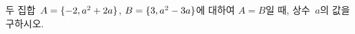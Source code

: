 두 집합~$A=\{-2{,}\mkern3mu\mathopen{}a^2+2a\}$, $B=\{3{,}\mkern3mu\mathopen{}a^2-3a\}$에 대하여 $A=B$일 때, 상수~$a$의 값을 구하시오.

